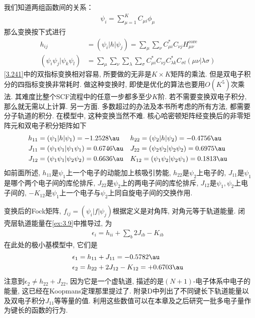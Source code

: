 我们知道两组函数间的关系：
\begin{align}
	\psi_i = \sum_{\mu=1}^{K}C_{\mu i}\phi_\mu
\end{align}
那么变换按下式进行
\begin{align}
	\label{3.241}
	h_{ij} & = (\psi_i|h|\psi_j) = \sum_{\mu}\sum_{\nu}C_{\mu i}^*C_{\nu j}H_{\mu\nu}^\mathrm{core}\\
	(\psi_i\psi_j|\psi_k\psi_l) & = \sum_\mu\sum_\nu\sum_\lambda\sum_\sigma C_{\mu i}^*C_{\nu j}C_{\lambda k}^*C_{\sigma l}(\mu\nu|\lambda\sigma)
\end{align}
\autoref{3.241}中的双指标变换相对容易, 所要做的无非是$K\times K$矩阵的乘法. 
但是双电子积分的四指标变换非常耗时. 做这种变换时, 即使是优化的算法也要用$O(K^5)$次乘法. 其难度比整个SCF流程中的任意一步都多至少$K$阶. 
若不需要变换双电子积分, 那么就无需以上计算. 另一方面. 多数超过\hft 的办法及本书所考虑的所有方法, 都需要分子轨道的积分. 
在模型中, 这种变换当然不难. 
核心哈密顿矩阵经变换后的非零矩阵元和双电子积分矩阵如下
\begin{align*}
	h_{11} & =(\psi_1|h|\psi_1)=-1.2528\au          &  & h_{22}=(\psi_2|h|\psi_2)=-0.4756\au          \\
	J_{11} & =(\psi_1\psi_1|\psi_1\psi_1)=0.6746\au &  & J_{22}=(\psi_2\psi_2|\psi_2\psi_2)=0.6975\au \\
	J_{12} & =(\psi_1\psi_1|\psi_2\psi_2)=0.6636\au &  & K_{12}=(\psi_1\psi_2|\psi_2\psi_1)=0.1813\au
\end{align*}
如前面所述, 
$h_{11}$是$\psi_1$上一个电子的动能加上核吸引势能, 
$h_{22}$是$\psi_2$上电子的, 
$J_{11}$是$\psi_1$是哪个两个电子间的库伦排斥, 
$J_{22}$是$\psi_2$上的两电子间的库伦排斥, 
$J_{12}$是$\psi_1,\psi_2$上电子间的, 
$-K_{12}$是$\psi_1$上一个电子与$\psi_2$上同自旋电子间的交换作用.


变换后的Fock矩阵, 
$f_{ij}=(\psi_i|f|\psi_j)$根据定义是对角阵, 
对角元等于轨道能量. 
闭壳层轨道能量在\autoref{ex:3.9}中推导过, 
为
\begin{align}
	\epsilon_i = h_{ii} + \sum_b2J_{ib} -K_{ib}
\end{align}
在此处的极小基模型中, 
它们是
\begin{align}
	\epsilon_1 & = h_{11} + J_{11} = -0.5782\au\\
	\epsilon_2 & = h_{22} + 2J_{12} - K_{12} = +0.6703\au
\end{align}
注意到$\epsilon_2\neq h_{22}+J_{22}$, 
因为它是一个虚轨道, 
描述的是$(N+1)$-电子体系中电子的能量, 
这已经在Koopmans定理那里提过了. 
附录D中列出了不同键长下轨道能量以及双电子积分$J_{11}$等等量的值. 
利用这些数值可以在本章及之后研究一批多电子量作为键长的函数的行为.


